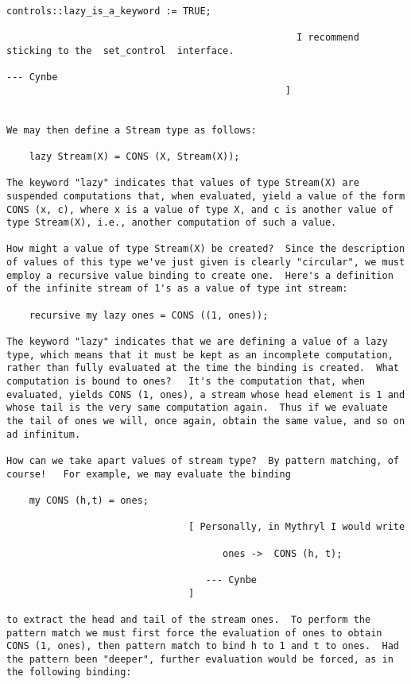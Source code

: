 \begin{verbatim}
                                                       controls::lazy_is_a_keyword := TRUE; 
 
                                                   I recommend sticking to the  set_control  interface. 
                                                                              --- Cynbe 
                                                 ] 
 
 
We may then define a Stream type as follows: 
 
    lazy Stream(X) = CONS (X, Stream(X)); 
 
The keyword "lazy" indicates that values of type Stream(X) are 
suspended computations that, when evaluated, yield a value of the form 
CONS (x, c), where x is a value of type X, and c is another value of 
type Stream(X), i.e., another computation of such a value. 
 
How might a value of type Stream(X) be created?  Since the description 
of values of this type we've just given is clearly "circular", we must 
employ a recursive value binding to create one.  Here's a definition 
of the infinite stream of 1's as a value of type int stream: 
 
    recursive my lazy ones = CONS ((1, ones)); 
 
The keyword "lazy" indicates that we are defining a value of a lazy 
type, which means that it must be kept as an incomplete computation, 
rather than fully evaluated at the time the binding is created.  What 
computation is bound to ones?   It's the computation that, when 
evaluated, yields CONS (1, ones), a stream whose head element is 1 and 
whose tail is the very same computation again.  Thus if we evaluate 
the tail of ones we will, once again, obtain the same value, and so on 
ad infinitum. 
 
How can we take apart values of stream type?  By pattern matching, of 
course!   For example, we may evaluate the binding 
 
    my CONS (h,t) = ones; 
 
                                [ Personally, in Mythryl I would write 
 
                                      ones ->  CONS (h, t); 
 
                                   --- Cynbe 
                                ] 
 
to extract the head and tail of the stream ones.  To perform the 
pattern match we must first force the evaluation of ones to obtain 
CONS (1, ones), then pattern match to bind h to 1 and t to ones.  Had 
the pattern been "deeper", further evaluation would be forced, as in 
the following binding: 
 

\end{verbatim}
